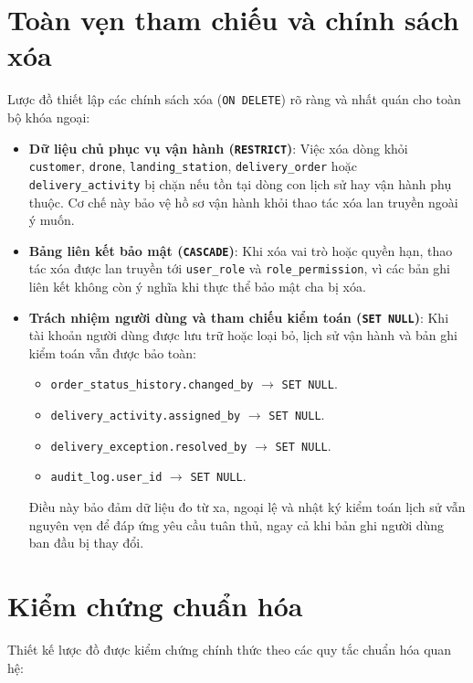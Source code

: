\section{Toàn vẹn tham chiếu và chính sách xóa}\label{s:referentialval}

Lược đồ thiết lập các chính sách xóa (\texttt{ON DELETE}) rõ ràng và nhất quán cho toàn bộ khóa ngoại:

\begin{itemize}
    \item \textbf{Dữ liệu chủ phục vụ vận hành (\texttt{RESTRICT})}: Việc xóa dòng khỏi \texttt{customer}, \texttt{drone}, \texttt{landing\_station}, \texttt{delivery\_order} hoặc \texttt{delivery\_activity} bị chặn nếu tồn tại dòng con lịch sử hay vận hành phụ thuộc. Cơ chế này bảo vệ hồ sơ vận hành khỏi thao tác xóa lan truyền ngoài ý muốn.
    \item \textbf{Bảng liên kết bảo mật (\texttt{CASCADE})}: Khi xóa vai trò hoặc quyền hạn, thao tác xóa được lan truyền tới \texttt{user\_role} và \texttt{role\_permission}, vì các bản ghi liên kết không còn ý nghĩa khi thực thể bảo mật cha bị xóa.
    \item \textbf{Trách nhiệm người dùng và tham chiếu kiểm toán (\texttt{SET NULL})}: Khi tài khoản người dùng được lưu trữ hoặc loại bỏ, lịch sử vận hành và bản ghi kiểm toán vẫn được bảo toàn:
    \begin{itemize}
        \item \texttt{order\_status\_history.changed\_by} $\to$ \texttt{SET NULL}.
        \item \texttt{delivery\_activity.assigned\_by} $\to$ \texttt{SET NULL}.
        \item \texttt{delivery\_exception.resolved\_by} $\to$ \texttt{SET NULL}.
        \item \texttt{audit\_log.user\_id} $\to$ \texttt{SET NULL}.
    \end{itemize}
    Điều này bảo đảm dữ liệu đo từ xa, ngoại lệ và nhật ký kiểm toán lịch sử vẫn nguyên vẹn để đáp ứng yêu cầu tuân thủ, ngay cả khi bản ghi người dùng ban đầu bị thay đổi.
\end{itemize}


\section{Kiểm chứng chuẩn hóa}\label{s:normalizationval}

Thiết kế lược đồ được kiểm chứng chính thức theo các quy tắc chuẩn hóa quan hệ:

